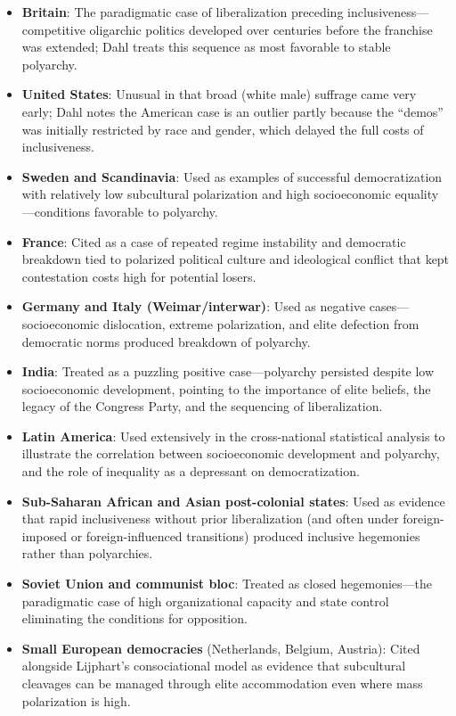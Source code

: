 \documentclass[12pt]{article}
\begin{document}
\begin{itemize}[leftmargin=*, itemsep=4pt]
    \item \textbf{Britain}: The paradigmatic case of liberalization preceding inclusiveness---competitive oligarchic politics developed over centuries before the franchise was extended; Dahl treats this sequence as most favorable to stable polyarchy.
    \item \textbf{United States}: Unusual in that broad (white male) suffrage came very early; Dahl notes the American case is an outlier partly because the ``demos'' was initially restricted by race and gender, which delayed the full costs of inclusiveness.
    \item \textbf{Sweden and Scandinavia}: Used as examples of successful democratization with relatively low subcultural polarization and high socioeconomic equality---conditions favorable to polyarchy.
    \item \textbf{France}: Cited as a case of repeated regime instability and democratic breakdown tied to polarized political culture and ideological conflict that kept contestation costs high for potential losers.
    \item \textbf{Germany and Italy (Weimar/interwar)}: Used as negative cases---socioeconomic dislocation, extreme polarization, and elite defection from democratic norms produced breakdown of polyarchy.
    \item \textbf{India}: Treated as a puzzling positive case---polyarchy persisted despite low socioeconomic development, pointing to the importance of elite beliefs, the legacy of the Congress Party, and the sequencing of liberalization.
    \item \textbf{Latin America}: Used extensively in the cross-national statistical analysis to illustrate the correlation between socioeconomic development and polyarchy, and the role of inequality as a depressant on democratization.
    \item \textbf{Sub-Saharan African and Asian post-colonial states}: Used as evidence that rapid inclusiveness without prior liberalization (and often under foreign-imposed or foreign-influenced transitions) produced inclusive hegemonies rather than polyarchies.
    \item \textbf{Soviet Union and communist bloc}: Treated as closed hegemonies---the paradigmatic case of high organizational capacity and state control eliminating the conditions for opposition.
    \item \textbf{Small European democracies} (Netherlands, Belgium, Austria): Cited alongside Lijphart's consociational model as evidence that subcultural cleavages can be managed through elite accommodation even where mass polarization is high.
\end{itemize}
\end{document}
